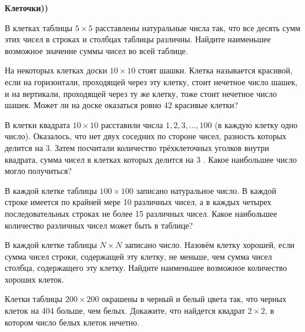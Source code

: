 \centerline{\bf \Huge Клеточки))}

\begin{flushright}
        \scriptsize{}
\end{flushright}

 В клетках таблицы $5 \times 5$ расставлены натуральные числа так, что все десять сумм этих чисел в строках и столбцах таблицы различны. Найдите наименьшее возможное значение суммы чисел во всей таблице.

 На некоторых клетках доски $10 \times 10$ стоят шашки. Клетка называется красивой, если на горизонтали, проходящей через эту клетку, стоит нечетное число шашек, и на вертикали, проходящей через ту же клетку, тоже стоит нечетное число шашек. Может ли на доске оказаться ровно 42 красивые клетки?

 В клетки квадрата $10 \times 10$ расставили числа $1,2,3, \ldots, 100$ (в каждую клетку одно число). Оказалось, что нет двух соседних по стороне чисел, разность которых делится на 3. Затем посчитали количество трёхклеточных уголков внутри квадрата, сумма чисел в клетках которых делится на 3 . Какое наибольшее число могло получиться?

 В каждой клетке таблицы $100 \times 100$ записано натуральное число. В каждой строке имеется по крайней мере 10 различных чисел, а в каждых четырех последовательных строках не более 15 различных чисел. Какое наибольшее количество различных чисел может быть в таблице?

 В каждой клетке таблицы $N \times N$ записано число. Назовём клетку хорошей, если сумма чисел строки, содержащей эту клетку, не меньше, чем сумма чисел столбца, содержащего эту клетку. Найдите наименьшее возможное количество хороших клеток.

 Клетки таблицы $200 \times 200$ окрашены в черный и белый цвета так, что черных клеток на 404 больше, чем белых. Докажите, что найдется квадрат $2 \times 2$, в котором число белых клеток нечетно.
